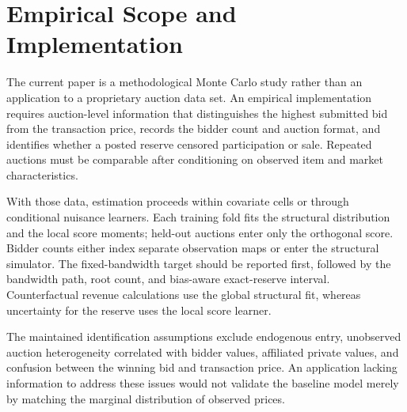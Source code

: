 \section{Empirical Scope and Implementation}

The current paper is a methodological Monte Carlo study rather than an
application to a proprietary auction data set. An empirical implementation
requires auction-level information that distinguishes the highest submitted
bid from the transaction price, records the bidder count and auction format,
and identifies whether a posted reserve censored participation or sale. Repeated
auctions must be comparable after conditioning on observed item and market
characteristics.

With those data, estimation proceeds within covariate cells or through
conditional nuisance learners. Each training fold fits the structural
distribution and the local score moments; held-out auctions enter only the
orthogonal score. Bidder counts either index separate observation maps or enter
the structural simulator. The fixed-bandwidth target should be reported first,
followed by the bandwidth path, root count, and bias-aware exact-reserve
interval. Counterfactual revenue calculations use the global structural fit,
whereas uncertainty for the reserve uses the local score learner.

The maintained identification assumptions exclude endogenous entry,
unobserved auction heterogeneity correlated with bidder values, affiliated
private values, and confusion between the winning bid and transaction price.
An application lacking information to address these issues would not validate
the baseline model merely by matching the marginal distribution of observed
prices.
